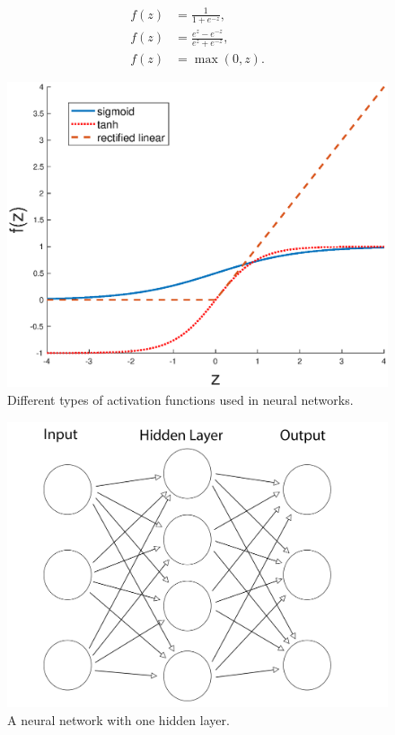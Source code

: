 \documentclass[journal,twoside]{IEEEtran}
\begin{document}
\begin{subequations}
	\begin{align}
	f(z)&=\frac{1}{1+e^{-z}}, \label{eq:3a}\\
	f(z)&=\frac{e^{z}-e^{-z}}{e^{z}+e^{-z}}, \label{eq:3b}\\
	f(z)&=\max(0,z). \label{eq:3c}
	\end{align}
\end{subequations}

\begin{figure}[!h]
	\centering
	\includegraphics[width=0.9\columnwidth]{Activation_functions}
	\caption{Different types of activation functions used in neural networks.}
	\label{actfunc}
\end{figure}

\begin{figure}[!h]
	\centering
	\includegraphics[width=0.9\columnwidth]{figure-1}
	\caption{A neural network with one hidden layer.}
	\label{nnonelayer}
\end{figure}
\end{document}
